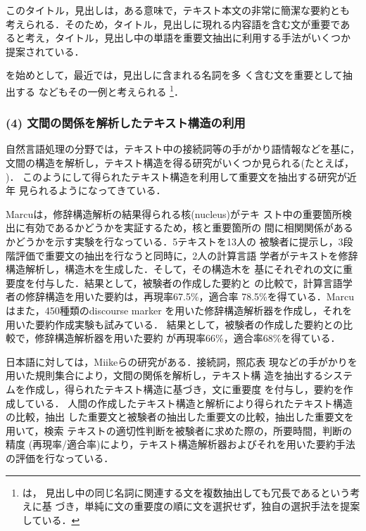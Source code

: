 このタイトル，見出しは，ある意味で，テキスト本文の非常に簡潔な要約とも
考えられる．そのため，タイトル，見出しに現れる内容語を含む文が重要であ
ると考え，タイトル，見出し中の単語を重要文抽出に利用する手法がいくつか
提案されている．

\cite{edmundson:69:a}を始めとして，最近では，見出しに含まれる名詞を多
く含む文を重要として抽出する
\cite{kameda:96:a,nakao:97:a,ochitani:97:a}などもその一例と考えられる
\footnote{\cite{nakao:97:a}は，
見出し中の同じ名詞に関連する文を複数抽出しても冗長であるという考えに基
づき，単純に文の重要度の順に文を選択せず，独自の選択手法を提案している．}．

\subsubsection{(4) 文間の関係を解析したテキスト構造の利用}

自然言語処理の分野では，テキスト中の接続詞等の手がかり語情報などを基に，
文間の構造を解析し，テキスト構造を得る研究がいくつか見られる(たとえば，
\cite{fukumoto:91:a,sumita:92:a,kurohashi:94:a})．
このようにして得られたテキスト構造を利用して重要文を抽出する研究が近年
見られるようになってきている\cite{miike:94:a,marcu:97:a}．

Marcu\cite{marcu:97:a}は，修辞構造解析の結果得られる核(nucleus)がテキ
スト中の重要箇所検出に有効であるかどうかを実証するため，核と重要箇所の
間に相関関係があるかどうかを示す実験を行なっている．5テキストを13人の
被験者に提示し，3段階評価で重要文の抽出を行なうと同時に，2人の計算言語
学者がテキストを修辞構造解析し，構造木を生成した．そして，その構造木を
基にそれぞれの文に重要度を付与した．結果として，被験者の作成した要約と
の比較で，計算言語学者の修辞構造を用いた要約は，再現率67.5\%，適合率
78.5\%を得ている．Marcuはまた，450種類のdiscourse marker
を用いた修辞構造解析器を作成し，それを用いた要約作成実験も試みている．
結果として，被験者の作成した要約との比較で，修辞構造解析器を用いた要約
が再現率66\%，適合率68\%を得ている．

日本語に対しては，Miikeらの研究\cite{miike:94:a}がある．接続詞，照応表
現などの手がかりを用いた規則集合により，文間の関係を解析し，テキスト構
造を抽出するシステムを作成し，得られたテキスト構造に基づき，文に重要度
を付与し，要約を作成している．
人間の作成したテキスト構造と解析により得られたテキスト構造の比較，抽出
した重要文と被験者の抽出した重要文の比較，抽出した重要文を用いて，検索
テキストの適切性判断を被験者に求めた際の，所要時間，判断の精度
(再現率/適合率)により，テキスト構造解析器およびそれを用いた要約手法
の評価を行なっている．

